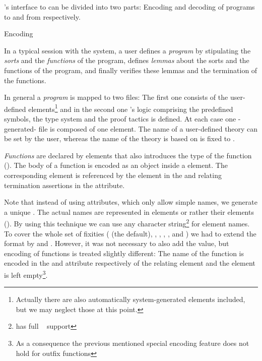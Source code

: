 \begin{omgroup}[id=verifun,short=VeriFun,creators={nmueller}]
{\verifun}'s interface to {\omdoc} can be divided into two parts: Encoding and decoding of
{\verifun} programs to and from {\omdoc} respectively.

\begin{omgroup}{Encoding}

In a typical session with the system, a user defines a {\emph{program}} by stipulating the
{\emph{sorts}} and the {\emph{functions}} of the program, defines {\emph{lemmas}} about
the sorts and the functions of the program, and finally verifies these lemmas and the
termination of the functions.

In general a {\emph{program}} is mapped to two {\omdoc} files: The first one consists of
the user-defined elements\footnote{Actually there are also automatically system-generated
  elements included, but we may neglect those at this point.} and in the second one
{\mbox{{\verifun}'s}} logic comprising the predefined symbols, the type system and the
proof tactics is defined. At each case one {\verifun}-generated-{\omdoc} file is composed
of one {} element. The name of a user-defined theory can be set by the
user, whereas the name of the theory {\mbox{\verifun}} is based on is fixed to
{}.

{\emph{Functions}} are declared by {} elements that also introduces the
type of the function ().  The body of a function is encoded as
an {\openmath} object inside a {} element. The corresponding
{} element is referenced by the {} element in the
{} and relating termination assertions in the
{} attribute.

Note that instead of using {} attributes, which only allow {\xml}
simple names, we generate a unique {}. The actual {\verifun} names are represented
in {} elements or rather their {} elements
(). By using this technique we can use any character
string\footnote{{\verifun} has full {\unicode}~\cite{Unicode:tuc03} support} for element
names. To cover the whole set of {\verifun} fixities
({} (the default),
{}, {},
{}, {}, and
{}) we had to extend the {\omdoc} format by
{} and
{}. However, it was not necessary to also add the
{} value, but encoding of
{} functions is treated slightly different: The name
of the function is encoded in the {} and
{} attribute respectively of the relating
{} element and the {} element is left empty\footnote{As
  a consequence the previous mentioned special encoding feature does not hold for outfix
  functions}.


\end{omgroup}
\end{omgroup}
